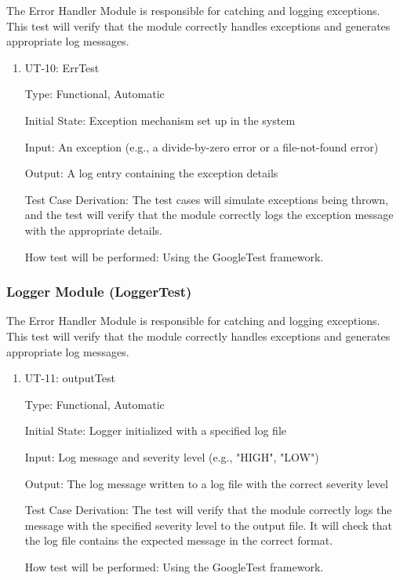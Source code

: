 \documentclass[12pt, titlepage]{article}
\begin{document}
The Error Handler Module is responsible for catching and logging exceptions.
This test will verify that the module correctly handles exceptions and generates
appropriate log messages.

\begin{enumerate}

\item{UT-10: ErrTest\\}

Type: Functional, Automatic
					
Initial State: Exception mechanism set up in the system
					
Input: An exception (e.g., a divide-by-zero error or a file-not-found error)
					
Output: A log entry containing the exception details

Test Case Derivation: The test cases will simulate exceptions being thrown, and
the test will verify that the module correctly logs the exception message with
the appropriate details.

How test will be performed: Using the GoogleTest framework.
    
\end{enumerate}

\subsubsection{Logger Module (LoggerTest)}

The Error Handler Module is responsible for catching and logging exceptions.
This test will verify that the module correctly handles exceptions and generates
appropriate log messages.

\begin{enumerate}

\item{UT-11: outputTest\\}

Type: Functional, Automatic
					
Initial State: Logger initialized with a specified log file

Input: Log message and severity level (e.g., "HIGH", "LOW")

Output: The log message written to a log file with the correct severity level

Test Case Derivation: The test will verify that the module correctly logs the
message with the specified severity level to the output file. It will check that
the log file contains the expected message in the correct format.

How test will be performed: Using the GoogleTest framework.
    
\end{enumerate}
\end{document}
